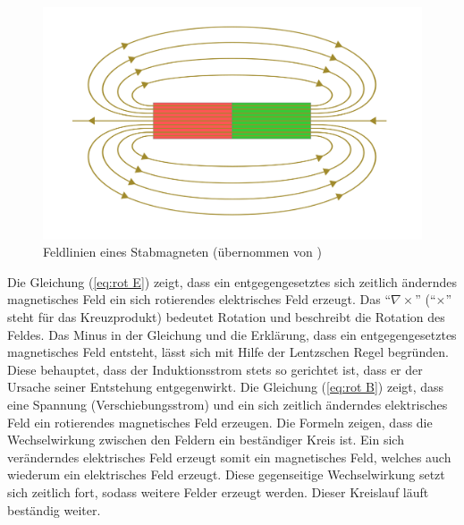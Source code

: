 \begin{figure}[h]
    \centering
    \includegraphics[width=.9\textwidth]{fig/feldlinien-stabmagnet (1).png}
    \caption{Feldlinien eines Stabmagneten (übernommen von \cite{Stabmagnet})}
    \label{fig:stabm}
\end{figure}
Die Gleichung (\ref{eq:rot E}) zeigt, dass ein entgegengesetztes sich zeitlich änderndes magnetisches Feld ein sich rotierendes elektrisches Feld erzeugt.
Das "`$ \nabla \times$"' ("`$\times$"' steht für das Kreuzprodukt) bedeutet Rotation und beschreibt die Rotation des Feldes.
Das Minus in der Gleichung und die Erklärung, dass ein entgegengesetztes magnetisches Feld entsteht, lässt sich mit Hilfe der Lentzschen Regel begründen.
Diese behauptet, dass der Induktionsstrom stets so gerichtet ist, dass er der Ursache seiner Entstehung entgegenwirkt.
Die Gleichung (\ref{eq:rot B}) zeigt, dass eine Spannung (Verschiebungsstrom) und ein sich zeitlich änderndes elektrisches Feld ein rotierendes magnetisches Feld erzeugen.
Die Formeln zeigen, dass die Wechselwirkung zwischen den Feldern ein beständiger Kreis ist. 
Ein sich veränderndes elektrisches Feld erzeugt somit ein magnetisches Feld, welches auch wiederum ein elektrisches Feld erzeugt.
Diese gegenseitige Wechselwirkung setzt sich zeitlich fort, sodass weitere Felder erzeugt werden.
Dieser Kreislauf läuft beständig weiter.

